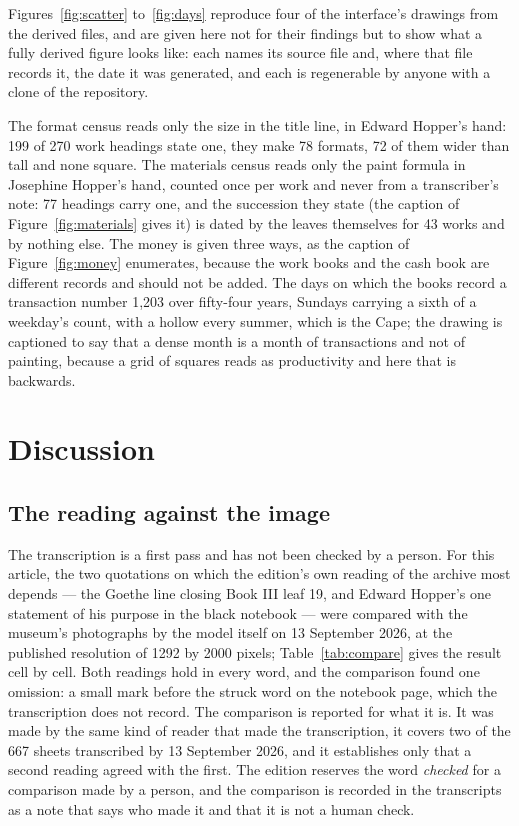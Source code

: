\documentclass[11pt]{article}
\begin{document}
Figures~\ref{fig:scatter} to~\ref{fig:days} reproduce four of the interface's drawings from the derived files, and are given here not for their findings but to show what a fully derived figure looks like: each names its source file and, where that file records it, the date it was generated, and each is regenerable by anyone with a clone of the repository.






The format census reads only the size in the title line, in Edward Hopper's hand: 199 of 270 work headings state one, they make 78 formats, 72 of them wider than tall and none square. The materials census reads only the paint formula in Josephine Hopper's hand, counted once per work and never from a transcriber's note: 77 headings carry one, and the succession they state (the caption of Figure~\ref{fig:materials} gives it) is dated by the leaves themselves for 43 works and by nothing else. The money is given three ways, as the caption of Figure~\ref{fig:money} enumerates, because the work books and the cash book are different records and should not be added. The days on which the books record a transaction number 1,203 over fifty-four years, Sundays carrying a sixth of a weekday's count, with a hollow every summer, which is the Cape; the drawing is captioned to say that a dense month is a month of transactions and not of painting, because a grid of squares reads as productivity and here that is backwards.

\section{Discussion}

\subsection{The reading against the image}

The transcription is a first pass and has not been checked by a person. For this article, the two quotations on which the edition's own reading of the archive most depends — the Goethe line closing Book III leaf 19, and Edward Hopper's one statement of his purpose in the black notebook — were compared with the museum's photographs by the model itself on 13 September 2026, at the published resolution of 1292 by 2000 pixels; Table~\ref{tab:compare} gives the result cell by cell. Both readings hold in every word, and the comparison found one omission: a small mark before the struck word on the notebook page, which the transcription does not record. The comparison is reported for what it is. It was made by the same kind of reader that made the transcription, it covers two of the 667 sheets transcribed by 13 September 2026, and it establishes only that a second reading agreed with the first. The edition reserves the word \emph{checked} for a comparison made by a person, and the comparison is recorded in the transcripts as a note that says who made it and that it is not a human check.
\end{document}
